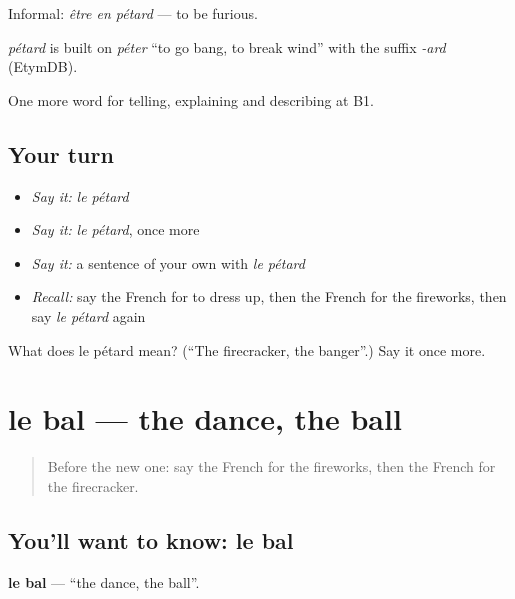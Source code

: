 Informal: \emph{être en pétard} — to be furious.

\begin{cousinweb}
\emph{pétard} is built on \emph{péter} \textquotedblleft{}to go bang, to break wind\textquotedblright{} with the suffix \emph{-ard} (EtymDB).
\end{cousinweb}

\begin{grammarlens}[title={What you've built}]
One more word for telling, explaining and describing at B1.
\end{grammarlens}

\subsection*{Your turn}
\begin{itemize}
\raggedright
  \item \emph{Say it:} \emph{le pétard}
  \item \emph{Say it:} \emph{le pétard}, once more
  \item \emph{Say it:} a sentence of your own with \emph{le pétard}
  \item \emph{Recall:} say the French for to dress up, then the French for the fireworks, then say \emph{le pétard} again
\end{itemize}

\begin{tcolorbox}[breakable,colback=teal!4,colframe=teal!35!black,title={Before you move on}]
What does le pétard mean? (\textquotedblleft{}The firecracker, the banger\textquotedblright{}.) Say it once more.
\end{tcolorbox}
\section[le bal]{le bal — the dance, the ball}

\label{lesson:FR-C318-bal}



\begin{quote}
Before the new one: say the French for the fireworks, then the French for the firecracker.
\end{quote}

\subsection*{You'll want to know: le bal}
\textbf{le bal} — \textquotedblleft{}the dance, the ball\textquotedblright{}.

